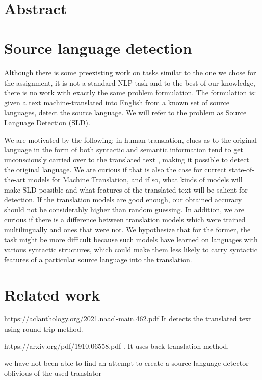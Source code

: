 \documentclass[twocolumn]{article}
\title{{\Huge \textbf{}} \\ }
\author{ \\ {\small }}
\date{}
\begin{document}
\section*{Abstract}

\section*{Source language detection}

Although there is some preexisting work on tasks similar to the one we chose for the assignment, it is not a standard NLP task and to the best of our knowledge, there is no work with exactly the same problem formulation. The formulation is: given a text machine-translated into English from a known set of source languages, detect the source language. We will refer to the problem as Source Language Detection (SLD).

We are motivated by the following: in human translation, clues as to the original language in the form of both syntactic and semantic information tend to get unconsciously carried over to the translated text \cite{literary}, making it possible to detect the original language. We are curious if that is also the case for currect state-of-the-art models for Machine Translation, and if so, what kinds of models will make SLD possible and what features of the translated text will be salient for detection. If the translation models are good enough, our obtained accuracy should not be considerably higher than random guessing. In addition, we are curious if there is a difference between translation models which were trained multilingually and ones that were not. We hypothesize that for the former, the task might be more difficult because such models have learned on languages with various syntactic structures, which could make them less likely to carry syntactic features of a particular source language into the translation.


\section*{Related work}

https://aclanthology.org/2021.naacl-main.462.pdf 
 It detects the translated text using round-trip method. 


https://arxiv.org/pdf/1910.06558.pdf
. It uses back translation method. 

we have not been able to find an attempt to create a source language detector oblivious of the used translator
\end{document}
